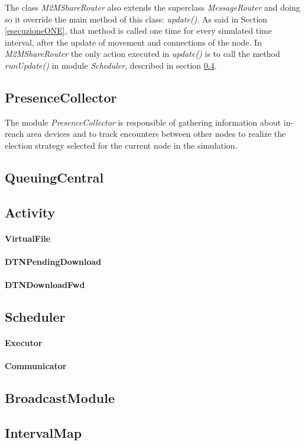 The class \textit{M2MShareRouter} also extends the superclass \textit{MessageRouter} and doing so it override the main method of this class: \textit{update()}. As said in Section \ref{esecuzioneONE}, that method is called one time for every simulated time interval, after the update of movement and connections of the node. In \textit{M2MShareRouter} the only action executed in \textit{update()} is to call the method \textit{runUpdate()} in module \textit{Scheduler}, described in section \ref{schedulerImplementazione}.

\subsection{PresenceCollector}
The module \textit{PresenceCollector} is responsible of gathering information about in-reach area devices and to track encounters between other nodes to realize the election strategy selected for the current node in the simulation.

\subsection{QueuingCentral}

\subsection{Activity}
\paragraph{VirtualFile}
\paragraph{DTNPendingDownload}
\paragraph{DTNDownloadFwd}

\subsection{Scheduler}
\label{schedulerImplementazione}
\paragraph{Executor}
\paragraph{Communicator}

\subsection{BroadcastModule}

\subsection{IntervalMap}
 

